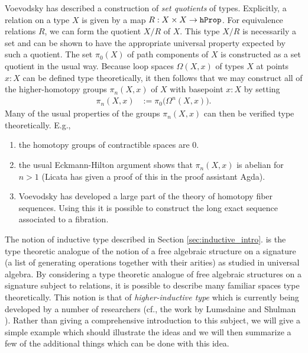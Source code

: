\documentclass{amsart}
\newcommand{\hprop}{\textnormal{\texttt{hProp}}}
\theoremstyle{definition}
\theoremstyle{remark}
\numberwithin{equation}{section}
\begin{document}
Voevodsky \cite{Vo2012a} has described a construction of \emph{set quotients}
of types.  Explicitly, a relation on a type $X$ is given by a map
$R:X\times X\to\hprop$.  For equivalence relations $R$, we can form
the quotient $X/R$ of $X$.  This type $X/R$ is necessarily a set and
can be shown to have the appropriate universal property expected by
such a quotient.  The set $\pi_{0}(X)$ of path components of $X$ is
constructed as a set quotient in the usual way.  Because loop spaces
$\Omega(X,x)$ of types $X$ at points $x:X$ can be defined type
theoretically, it then follows that we may construct all of the
higher-homotopy groups $\pi_{n}(X,x)$ of $X$ with basepoint $x:X$ by
setting 
\begin{align*}
  \pi_{n}(X,x) & := \pi_{0}\bigl(\Omega^{n}(X,x)\bigr).
\end{align*}
Many of the usual properties of the groups $\pi_{n}(X,x)$ can then be
verified type theoretically.  E.g.,
\begin{enumerate}
\item the homotopy groups of contractible spaces are $0$.
\item the usual Eckmann-Hilton \cite{Eckmann:1961tx} argument shows that $\pi_{n}(X,x)$ is abelian for $n>1$
  (Licata \cite{Licata} has given a proof of this in the proof assistant Agda).
\item Voevodsky has developed a large part of the theory of homotopy
  fiber sequences.  Using this it is possible to construct the long
  exact sequence associated to a fibration.
\end{enumerate}

The notion of inductive type described in Section \ref{sec:inductive_intro}. is the type
theoretic analogue of the notion of a free algebraic structure on
a signature (a list of generating operations together with their
arities) as studied in universal algebra.  By considering a type
theoretic analogue of free algebraic structures on a signature subject to
relations, it is possible to describe many familiar spaces type
theoretically.  This notion is that of \emph{higher-inductive
  type} which is currently being developed by a number of researchers
(cf., the work by Lumsdaine and Shulman \cite{Lumsdaine:HIT,Shulman:HTTVI}).
Rather than giving a comprehensive introduction to this
subject, we will give a simple example which should illustrate the
ideas and we will then summarize a few of the additional things which
can be done with this idea.
\end{document}
